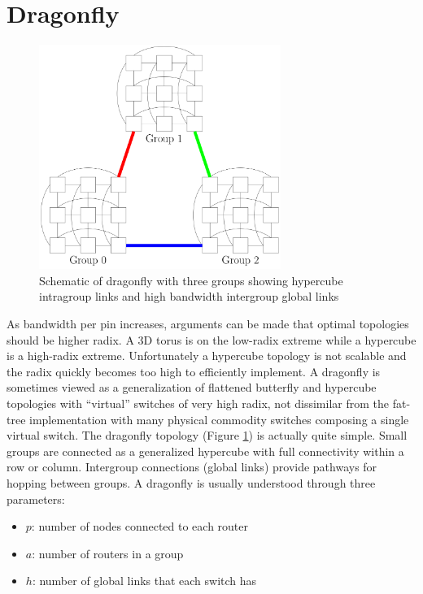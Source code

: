 
\section{Dragonfly}
\label{sec:tutorial:dragonfly}

\begin{figure}[h!]
\centering
\includegraphics[width=0.7\textwidth]{figures/tikz/dragonfly/dragonfly.png}
\caption{Schematic of dragonfly with three groups showing hypercube intragroup links and high bandwidth intergroup global links}
\label{fig:topologies:dragonfly}
\end{figure}

As bandwidth per pin increases, arguments can be made that optimal topologies should be higher radix.
A 3D torus is on the low-radix extreme while a hypercube is a high-radix extreme.
Unfortunately a hypercube topology is not scalable and the radix quickly becomes too high to efficiently implement.
A dragonfly is sometimes viewed as a generalization of flattened butterfly and hypercube topologies with ``virtual'' switches of very high radix,
not dissimilar from the fat-tree implementation with many physical commodity switches composing a single virtual switch.
The dragonfly topology (Figure \ref{fig:topologies:dragonfly}) is actually quite simple. 
Small groups are connected as a generalized hypercube with full connectivity within a row or column.
Intergroup connections (global links) provide pathways for hopping between groups.
A dragonfly is usually understood through three parameters:
\begin{itemize}
\item $p$: number of nodes connected to each router
\item $a$: number of routers in a group
\item $h$: number of global links that each switch has
\end{itemize}

